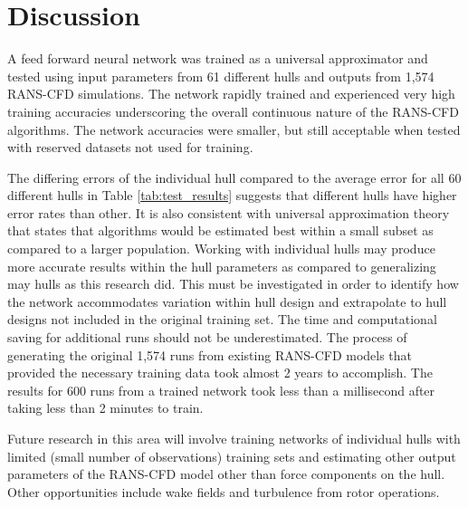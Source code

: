 \documentclass[twoside,twocolumn]{article}
\begin{document}
	
	\section{Discussion}
	
	A feed forward neural network was trained as a universal approximator and tested using input parameters from 61 different hulls and outputs from 1,574 RANS-CFD simulations. The network rapidly trained and experienced very high training accuracies underscoring the overall continuous nature of the RANS-CFD algorithms. The network accuracies were smaller, but still acceptable when tested with reserved datasets not used for training.

	The differing errors of the individual hull compared to the average error for all 60 different hulls in Table \ref{tab:test_results} suggests that different hulls have higher error rates than other. It is also consistent with universal approximation theory that states that algorithms would be estimated best within a small subset as compared to a larger population. Working with individual hulls may produce more accurate results within the hull parameters as compared to generalizing may hulls as this research did. This must be investigated in order to identify how the network accommodates variation within hull design and extrapolate to hull designs not included in the original training set.
	The time and computational saving for additional runs should not be underestimated. The process of generating the original 1,574 runs from existing RANS-CFD models that provided the necessary training data took almost 2 years to accomplish. The results for 600 runs from a trained network took less than a millisecond after taking less than 2 minutes to train.
	
	Future research in this area will involve training networks of individual hulls with limited (small number of observations) training sets and estimating other output parameters of the RANS-CFD model other than force components on the hull. Other opportunities include wake fields and turbulence from rotor operations. 
	
	
	{}
	
	
\end{document}
